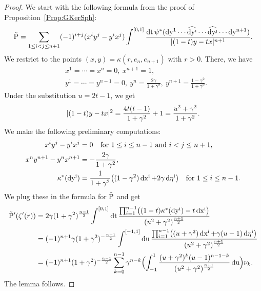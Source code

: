 \documentclass[\MainFolder/Text.tex]{subfiles}
\begin{document}
\begin{proof}
We start with the following formula from the proof of Proposition~\ref{Prop:GKerSph}:
\[ \tilde{\mathrm{P}} =  \sum_{1\le i<j \le n+1} (-1)^{i+j}(x^i y^j - y^i x^j) \int^{[0,1]}  \frac{\operatorname{dt} \psi^*(\operatorname{dy^1} \dotsm \widehat{\operatorname{dy^i}} \dotsm \widehat{\operatorname{dy^j}} \dotsm \operatorname{dy^{n+1}})}{|(1-t)y-tx|^{n+1}}. \]
We restrict to the points $(x,y)=\kappa(r,e_n,e_{n+1})$ with $r>0$. There, we have
\begin{align*}
&x^1= \dotsb =x^n=0,\ x^{n+1}=1, \\
&y^1 = \dotsb = y^{n-1} =0,\ y^n= \frac{2\gamma}{1+\gamma^2},\ y^{n+1} = \frac{1-\gamma^2}{1+\gamma^2}.
\end{align*}
Under the substitution $u = 2t-1$, we get
\[|(1-t)y-t x|^2 = \frac{4 t (t-1)}{1+\gamma^2}+1=\frac{u^2+\gamma^2}{1+\gamma^2}. \]
We make the following preliminary computations:
\[ \begin{aligned}
x^i y^j - y^i x^j & = 0\quad\text{for }1\le i \le n-1\text{ and }i<j\le n+1, \\
x^n y^{n+1} - y^n x^{n+1} & = -\frac{2\gamma}{1+\gamma^2}, \\
\kappa^*(\operatorname{dy^i}) & = \frac{1}{1+\gamma^2}\bigl((1-\gamma^2)\operatorname{dx^i}+ 2\gamma \operatorname{d\eta^i}\bigr)\quad\text{for } 1\le i \le n-1. \end{aligned} \]
We plug these in the formula for $\tilde{\mathrm{P}}$ and get
%
\begin{align*}
 \tilde{\mathrm{P}}'(\zeta'(r)) &= 2\gamma(1+\gamma^2)^{\frac{n-1}{2}} \int^{[0,1]}\operatorname{dt}\frac{\prod_{i=1}^{n-1} \bigl((1-t)\kappa^*(\operatorname{dy^i}) - t\operatorname{dx^i}\bigr)}{(u^2+\gamma^2)^{\frac{n+1}{2}}}  \\ 
&=(-1)^{n+1}\gamma(1+\gamma^2)^{-\frac{n-1}{2}}\int^{[-1,1]} \operatorname{du} \frac{\prod_{i=1}^{n-1}\bigl((u+\gamma^2)\operatorname{dx^i} + \gamma(u-1)\operatorname{d\eta^i}\bigr)}{(u^2+\gamma^2)^{\frac{n+1}{2}}}  \\
& =(-1)^{n+1}(1+\gamma^2)^{-\frac{n-1}{2}}\sum_{k=0}^{n-1} \gamma^{n-k}\Bigl( \int_{-1}^1 \frac{(u+\gamma^2)^{k}(u-1)^{n-1-k}}{(u^2+\gamma^2)^{\frac{n+1}{2}}} \operatorname{du}\Bigr) \nu_{k}.
\end{align*}
The lemma follows.
\end{proof}
\end{document}
